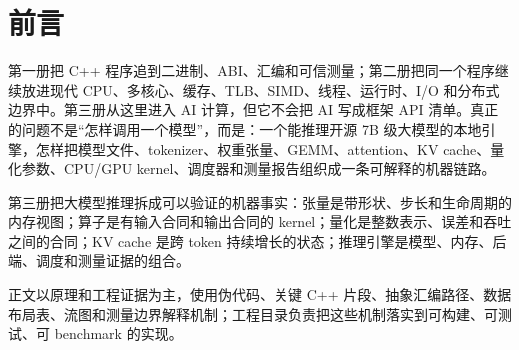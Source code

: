 \chapter*{前言}

第一册把 C++ 程序追到二进制、ABI、汇编和可信测量；第二册把同一个程序继续放进现代 CPU、多核心、缓存、TLB、SIMD、线程、运行时、I/O 和分布式边界中。第三册从这里进入 AI 计算，但它不会把 AI 写成框架 API 清单。真正的问题不是“怎样调用一个模型”，而是：一个能推理开源 7B 级大模型的本地引擎，怎样把模型文件、tokenizer、权重张量、GEMM、attention、KV cache、量化参数、CPU/GPU kernel、调度器和测量报告组织成一条可解释的机器链路。

\begin{keyidea}
第三册把大模型推理拆成可以验证的机器事实：张量是带形状、步长和生命周期的内存视图；算子是有输入合同和输出合同的 kernel；量化是整数表示、误差和吞吐之间的合同；KV cache 是跨 token 持续增长的状态；推理引擎是模型、内存、后端、调度和测量证据的组合。
\end{keyidea}

正文以原理和工程证据为主，使用伪代码、关键 C++ 片段、抽象汇编路径、数据布局表、流图和测量边界解释机制；工程目录负责把这些机制落实到可构建、可测试、可 benchmark 的实现。
